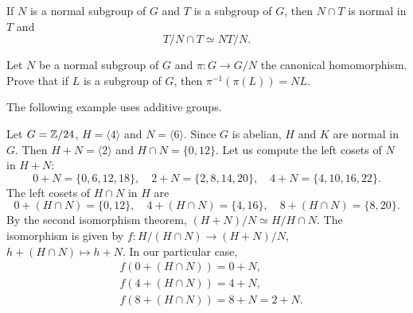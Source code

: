 \begin{exercise}
If $N$ is a normal subgroup of $G$ and 
$T$ is a subgroup of $G$, then $N\cap T$ is normal in $T$
and 
\[
T/N\cap T\simeq NT/N.
\]
\end{exercise}



\begin{exercise}
Let $N$ be a normal subgroup of $G$ and
$\pi\colon G\to G/N$ the canonical homomorphism. Prove that
if $L$ is a subgroup of $G$, then $\pi^{-1}(\pi(L))=NL$.
\end{exercise}

The following example uses additive groups. 

\begin{example}
Let $G=\mathbb{Z}/24$, $H=\langle 4\rangle$ and $N=\langle 6\rangle$. Since $G$ is abelian, $H$ and $K$ are normal in $G$. Then 
$H+N=\langle 2\rangle$ and $H\cap N=\{0,12\}$. Let us compute
the left cosets of $N$ in $H+N$:
\[
0+N=\{0,6,12,18\},
\quad
2+N=\{2,8,14,20\},
\quad
4+N=\{4,10,16,22\}.
\]
The left cosets of $H\cap N$ in $H$ are 
\[
0+(H\cap N)=\{0,12\},
\quad
4+(H\cap N)=\{4,16\},
\quad
8+(H\cap N)=\{8,20\}.
\]
By the second isomorphism theorem, $(H+N)/N\simeq H/H\cap N$. The
isomorphism is given by 
$f\colon H/(H\cap N)\to (H+N)/N$, $h+(H\cap N)\mapsto h+N$.
In our particular case, 
\begin{align*}
&f(0+(H\cap N))=0+N,\\
&f(4+(H\cap N))=4+N,\\
&f(8+(H\cap N))=8+N=2+N.
\end{align*}
\end{example}

